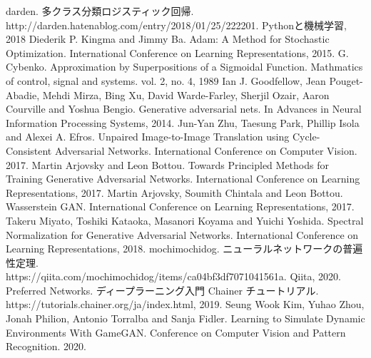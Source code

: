 \begin{thebibliography}{20}
     darden. 多クラス分類ロジスティック回帰. \\
    http://darden.hatenablog.com/entry/2018/01/25/222201. Pythonと機械学習, 2018
     Diederik P. Kingma and Jimmy Ba. Adam: A Method for Stochastic Optimization. 
    International Conference on Learning Representations, 2015.
     G. Cybenko. Approximation by Superpositions of a Sigmoidal Function. Mathmatics of control, signal and systems. vol. 2, no. 4, 1989
     Ian J. Goodfellow, Jean Pouget-Abadie, Mehdi Mirza, Bing Xu, David Warde-Farley, Sherjil Ozair, Aaron Courville and Yoshua Bengio. 
    Generative adversarial nets. In Advances in Neural Information Processing Systems, 2014.
     Jun-Yan Zhu, Taesung Park, Phillip Isola and Alexei A. Efros. Unpaired Image-to-Image Translation using Cycle-Consistent Adversarial Networks.
                    International Conference on Computer Vision. 2017.
    Martin Arjovsky and Leon Bottou. Towards Principled Methods for Training Generative Adversarial Networks.
    International Conference on Learning Representations, 2017.
     Martin Arjovsky, Soumith Chintala and Leon Bottou. Wasserstein GAN.
    International Conference on Learning Representations, 2017.
    Takeru Miyato, Toshiki Kataoka, Masanori Koyama and Yuichi Yoshida. Spectral Normalization for Generative Adversarial Networks. 
    International Conference on Learning Representations, 2018.
     mochimochidog. ニューラルネットワークの普遍性定理. \\
    https://qiita.com/mochimochidog/items/ca04bf3df7071041561a. Qiita, 2020.
    \bibitem{} Preferred Networks. ディープラーニング入門 Chainer チュートリアル.\\
    https://tutorials.chainer.org/ja/index.html, 2019.
     Seung Wook Kim, Yuhao Zhou, Jonah Philion, Antonio Torralba and Sanja Fidler.
    Learning to Simulate Dynamic Environments With GameGAN.  Conference on Computer Vision and Pattern Recognition. 2020.
\end{thebibliography}




